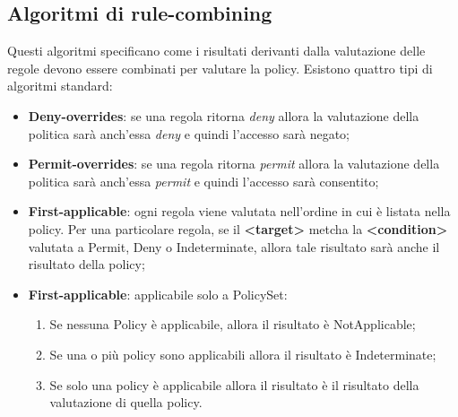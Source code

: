 \subsection{Algoritmi di rule-combining}
Questi algoritmi specificano come i risultati derivanti dalla valutazione delle regole devono essere combinati per valutare la policy. Esistono quattro  tipi di algoritmi standard:
\begin{itemize}
    \item \textbf{Deny-overrides}: se una regola ritorna \textit{deny} allora la valutazione della politica sarà anch'essa \textit{deny} e quindi l'accesso sarà negato;
    \item \textbf{Permit-overrides}: se una regola ritorna \textit{permit} allora la valutazione della politica sarà anch'essa \textit{permit} e quindi l'accesso sarà consentito;
    \item \textbf{First-applicable}: ogni regola viene valutata nell'ordine in cui è listata nella policy. Per una particolare regola, se il \textbf{<target>} metcha la \textbf{<condition>} valutata a Permit, Deny o Indeterminate, allora tale risultato sarà anche il risultato della policy;
    \item \textbf{First-applicable}: applicabile solo a PolicySet:
        \begin{enumerate}
            \item  Se nessuna Policy è applicabile, allora il risultato è NotApplicable;
        	\item  Se una o più policy sono applicabili allora il risultato è Indeterminate;
        	\item  Se solo una policy è applicabile allora il risultato è il risultato della valutazione di quella policy.
        \end{enumerate}
\end{itemize}








